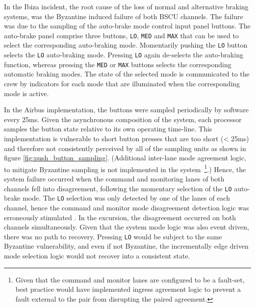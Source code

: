 In the Ibiza incident, the root cause of the loss of normal and alternative
braking systems, was the Byzantine induced failure of both BSCU channels. The
failure was due to the sampling of the auto-brake mode control input panel
buttons. The auto-brake panel comprise three buttons, \texttt{LO}, \texttt{MED} and \texttt{MAX} that can
be used to select the corresponding auto-braking mode.  Momentarily pushing the
\texttt{LO} button selects the \texttt{LO} auto-braking mode. Pressing \texttt{LO} again de-selects the
auto-braking function, whereas pressing the \texttt{MED} or \texttt{MAX} buttons  selects the
corresponding automatic braking  modes. The state of the selected mode is
communicated to the crew by indicators for each mode that are illuminated when
the corresponding mode is active.

In the Airbus implementation, the buttons were sampled periodically by software
every 25ms. Given the asynchronous composition of the system, each processor
samples the button state relative to its own operating time-line. This
implementation is vulnerable to short button presses that are too short (< 25ms)
and therefore not consistently perceived by all of the sampling units as shown in figure \ref{fig:push_button_sampling}.
(Additional inter-lane mode agreement logic, to mitigate Byzantine sampling is
not implemented in the system~\footnote{Given that the command and monitor lanes
  are configured to be a fault-set, best practice would have implemented ingress
  agreement logic to prevent a fault external to the pair from disrupting the
  paired agreement.}.) Hence, the system failure occurred when the command and
monitoring lanes of both channels fell into disagreement, following the momentary 
selection of the \texttt{LO} auto-brake mode. The \texttt{LO} selection was only detected by one
of the lanes of each channel, hence the command and monitor mode disagreement
detection logic was erroneously stimulated . In the excursion, the disagreement
occurred on both channels simultaneously. Given that the system mode logic was
also event driven, there was no path to recovery. Pressing \texttt{LO} would be subject
to the same Byzantine vulnerability, and even if not Byzantine, the
incrementally edge driven mode selection logic would not recover into a
consistent state.

